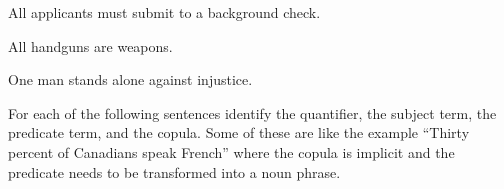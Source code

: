 \begin{exercises}
\item All applicants must submit to a background check.

\item All handguns are weapons.

\item One man stands alone against injustice.

\end{exercises}



\noindent \problempart For each of the following sentences identify the quantifier, the subject term, the predicate term, and the copula. Some of these are like the example ``Thirty percent of Canadians speak French'' where the copula is implicit and the predicate needs to be transformed into a noun phrase.


